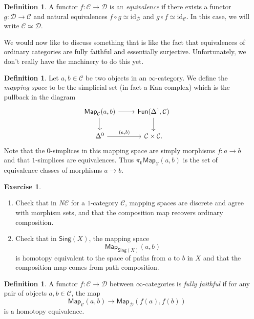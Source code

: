 \documentclass[10pt, oneside]{memoir}
\theoremstyle{definition}
\newtheorem{defn}[thm]{Definition}
\newtheorem{exer}[thm]{Exercise}
\theoremstyle{remark}
\theoremstyle{plain}
\theoremstyle{definition}
\theoremstyle{remark}
\newcommand{\mc}[1]{\mathcal{#1}}
\newcommand{\mr}[1]{\mathrm{#1}}
\newcommand{\ms}[1]{\mathsf{#1}}
\newcommand{\1}{\mathbf{1}}
\newcommand{\2}{\mathbf{2}}
\newcommand{\3}{\mathbf{3}}
\begin{document}
\begin{defn}
    A functor $f \colon \mc{C} \to \mc{D}$ is an \textit{equivalence} if there exists a functor $g \colon \mc{D} \to \mc{C}$ and natural equivalences $f \circ g \simeq \mr{id}_{\mc{D}}$ and $g \circ f \simeq \mr{id}_{\mc{C}}$. In this case, we will write $\mc{C} \simeq \mc{D}$.
\end{defn}

We would now like to discuss something that is like the fact that equivalences of ordinary categories are fully faithful and essentially surjective. Unfortunately, we don't really have the machinery to do this yet.

\begin{defn}
    Let $a,b \in \mc{C}$ be two objects in an $\infty$-category. We define the \textit{mapping space} to be the simplicial set (in fact a Kan complex) which is the pullback in the diagram
    \begin{equation*}
    \begin{tikzcd}
        \ms{Map}_{\mc{C}}(a,b) \ar{r} \ar{d} & \ms{Fun}(\Delta^1, \mc{C}) \ar{d} \\
        \Delta^0 \ar{r}{(a,b)} & \mc{C} \times \mc{C}.
    \end{tikzcd}
    \end{equation*}
    Note that the $0$-simplices in this mapping space are simply morphisms $f \colon a \to b$ and that $1$-simplices are equivalences. Thus $\pi_0 \ms{Map}_{\mc{C}}(a,b)$ is the set of equivalence classes of morphisms $a \to b$.
\end{defn}

\begin{exer}\leavevmode
    \begin{enumerate}
        \item Check that in $N\mc{C}$ for a $1$-category $\mc{C}$, mapping spaces are discrete and agree with morphism sets, and that the composition map recovers ordinary composition.
        \item Check that in $\ms{Sing}(X)$, the mapping space
        \[ \ms{Map}_{\ms{Sing}(X)}(a,b) \]
        is homotopy equivalent to the space of paths from $a$ to $b$ in $X$ and that the composition map comes from path composition.
    \end{enumerate}
\end{exer}

\begin{defn}
    A functor $f \colon \mc{C} \to \mc{D}$ between $\infty$-categories is \textit{fully faithful} if for any pair of objects $a,b \in \mc{C}$, the map
    \[ \ms{Map}_{\mc{C}}(a,b) \to \ms{Map}_{\mc{D}}(f(a), f(b)) \]
    is a homotopy equivalence.
\end{defn}
\end{document}
